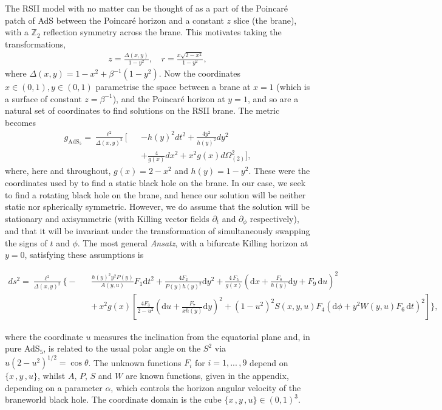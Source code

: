 \documentclass[%
 reprint,
 amsmath,amssymb,
 aps,
]{revtex4-2}
\begin{document}
The RSII model with no matter can be thought of as a part of the Poincar\'e patch of AdS between the Poincar\'e horizon and a constant $z$ slice (the brane), with a $\mathbb{Z}_2$ reflection symmetry across the brane. This motivates taking the transformations,
\begin{eqnarray}
    z = \frac{\Delta(x,y)}{1-y^2}, \quad r = \frac{x\sqrt{2-x^2}}{1-y^2},
\end{eqnarray}
where $\Delta(x,y) = 1-x^2 + \beta^{-1}(1-y^2)$. Now the coordinates $x \in (0,1), y \in (0,1)$ parametrise the space between a brane at $x=1$ (which is a surface of constant $z=\beta^{-1}$), and the Poincar\'e horizon at $y=1$, and so are a natural set of coordinates to find solutions on the RSII brane. The metric becomes
\begin{eqnarray}
\label{RSII}
    g_{\mathrm{AdS}_5} = \frac{\ell^2}{\Delta(x,y)^2}\Bigg[&&-h(y)^2dt^2+\frac{4y^2}{h(y)^2}dy^2  \nonumber\\&& +\frac{4}{g(x)}dx^2+x^2 g(x)d\Omega^2_{(2)}\Bigg],
\end{eqnarray}
where, here and throughout, $g(x) = 2-x^2$ and $h(y)=1-y^2$. These were the coordinates used by \cite{Figueras:2011gd} to find a static black hole on the brane. In our case, we seek to find a rotating black hole on the brane, and hence our solution will be neither static nor spherically symmetric. However, we do assume that the solution will be stationary and axisymmetric (with Killing vector fields $\partial_t$ and $\partial_\phi$ respectively), and that it will be invariant under the transformation of simultaneously swapping the signs of $t$ and $\phi$. The most general \emph{Ansatz}, with a bifurcate Killing horizon at $y=0$, satisfying these assumptions is
\begin{widetext}
\begin{eqnarray}\label{ansatz}
ds^2 = \frac{\ell^2}{\Delta(x,y)^2}\Bigg\{ -&&\frac{h(y)^2 y^2 P(y)}{A(y,u)}F_1\mathrm{d}t^2 + \frac{4 F_2}{P(y)h(y)^2}\mathrm{d}y^2 + \frac{4\,F_5}{g(x)}\left(\mathrm{d}x + \frac{F_8}{h(y)}\mathrm{d}y+F_9\,\mathrm{d}u\right)^2 \nonumber\\
&& +\,x^2 g(x)\left[\frac{4F_3}{2-u^2}\left(\mathrm{d}u+\frac{F_7}{xh(y)}\mathrm{d}y\right)^2 + (1-u^2)^2 S(x,y,u)F_4\left(\mathrm{d}\phi+y^2 W(y,u)F_6\,\mathrm{d}t\right)^2\right]\Bigg\},
\end{eqnarray}
\end{widetext}
where the coordinate $u$ measures the inclination from the equatorial plane and, in pure AdS$_5$, is related to the usual polar angle on the $S^2$ via $u(2-u^2)^{1/2} = \cos{\theta}$. The unknown functions $F_i$ for $i=1,...\,,9$ depend on $\{x\,,y\,,u\}$, whilst $A,\,P,\,S$ and $W$ are known functions, given in the appendix, depending on a parameter $\alpha$, which controls the horizon angular velocity of the braneworld black hole. The coordinate domain is the cube $\{x\,,y\,,u\}\in (0,1)^3$.
\end{document}
